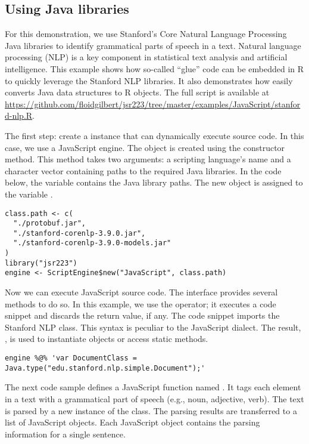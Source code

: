 \subsection{Using Java libraries}

For this demonstration, we use Stanford's Core Natural Language Processing Java libraries \citep{stanfordcorenlp} to identify grammatical parts of speech in a text. Natural language processing (NLP) is a key component in statistical text analysis and artificial intelligence. This example shows how so-called ``glue'' code can be embedded in R to quickly leverage the Stanford NLP libraries. It also demonstrates how easily  converts Java data structures to R objects. The full script is available at \url{https://github.com/floidgilbert/jsr223/tree/master/examples/JavaScript/stanford-nlp.R}.

The first step: create a   instance that can dynamically execute source code. In this case, we use a JavaScript engine. The object is created using the  constructor method. This method takes two arguments: a scripting language's name and a character vector containing paths to the required Java libraries. In the code below, the  variable contains the Java library paths. The new  object is assigned to the variable .

\begin{verbatim}
class.path <- c(
  "./protobuf.jar",
  "./stanford-corenlp-3.9.0.jar",
  "./stanford-corenlp-3.9.0-models.jar"
)
library("jsr223")
engine <- ScriptEngine$new("JavaScript", class.path)
\end{verbatim}
Now we can execute JavaScript source code. The  interface provides several methods to do so. In this example, we use the  operator; it executes a code snippet and discards the return value, if any. The code snippet imports the Stanford NLP  class. This syntax is peculiar to the JavaScript dialect. The result, , is used to instantiate objects or access static methods.

\begin{verbatim}
engine %@% 'var DocumentClass = Java.type("edu.stanford.nlp.simple.Document");'
\end{verbatim}
The next code sample defines a JavaScript function named . It tags each element in a text with a grammatical part of speech (e.g., noun, adjective, verb). The text is parsed by a new instance of the  class. The parsing results are transferred to a list of JavaScript objects. Each JavaScript object contains the parsing information for a single sentence.

